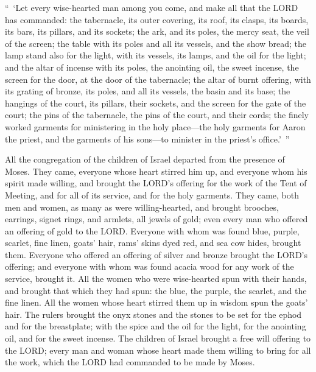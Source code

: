 \myverse{}“ ‘Let every wise-hearted man among you come, and make all that
the LORD has commanded:
\myverse{}the tabernacle, its outer covering, its roof, its clasps, its boards, its
bars, its pillars, and its sockets;
\myverse{}the ark, and its poles, the mercy seat, the veil of the screen;
\myverse{}the table with its poles and all its vessels, and the show bread;
\myverse{}the lamp stand also for the light, with its vessels, its lamps, and the oil
for the light;
\myverse{}and the altar of incense with its poles, the anointing oil, the sweet incense,
the screen for the door, at the door of the tabernacle;
\myverse{}the altar of burnt offering, with its grating of bronze, its poles, and all
its vessels, the basin and its base;
\myverse{}the hangings of the court, its pillars, their sockets, and the screen for
the gate of the court;
\myverse{}the pins of the tabernacle, the pins of the court, and their cords;
\myverse{}the finely worked garments for ministering in the holy place—the holy garments
for Aaron the priest, and the garments of his sons—to minister in the priest’s office.’ ”


\myverse{}All the congregation of the children of Israel departed from
the presence of Moses.
\myverse{}They came, everyone whose heart stirred him up, and everyone whom his spirit
made willing, and brought the LORD’s offering for the work of the Tent of Meeting, and for all of its
service, and for the holy garments.
\myverse{}They came, both men and women, as many as were willing-hearted, and brought
brooches, earrings, signet rings, and armlets, all jewels of gold; even every man who offered an offering
of gold to the LORD.
\myverse{}Everyone with whom was found blue, purple, scarlet, fine linen, goats’ hair,
rams’ skins dyed red, and sea cow hides, brought them.
\myverse{}Everyone who offered an offering of silver and bronze brought the LORD’s
offering; and everyone with whom was found acacia wood for any work of the service, brought it.
\myverse{}All the women who were wise-hearted spun with their hands, and brought that
which they had spun: the blue, the purple, the scarlet, and the fine linen.
\myverse{}All the women whose heart stirred them up in wisdom spun the goats’ hair.
\myverse{}The rulers brought the onyx stones and the stones to be set for the ephod
and for the breastplate;
\myverse{}with the spice and the oil for the light, for the anointing oil, and for
the sweet incense.
\myverse{}The children of Israel brought a free will offering to the LORD; every man
and woman whose heart made them willing to bring for all the work, which the LORD had commanded to be
made by Moses.


